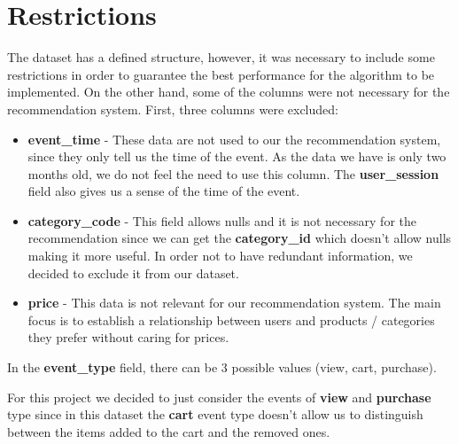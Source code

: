 \section{Restrictions}
\label{restrictions}

The dataset has a defined structure, however, it was necessary to include some restrictions in order to guarantee the best performance for the algorithm to be implemented.
On the other hand, some of the columns were not necessary for the recommendation system.
First, three columns were excluded:
\begin{itemize}
    \item \textbf{event\_time} - These data are not used to our the recommendation system, since they only tell us the time of the event.
    As the data we have is only two months old, we do not feel the need to use this column.
    The \textbf{user\_session} field also gives us a sense of the time of the event.
    \item \textbf{category\_code} - This field allows nulls and it is not necessary for the recommendation since we can get the \textbf{category\_id} which doesn't 
    allow nulls making it more useful.
    In order not to have redundant information, we decided to exclude it from our dataset.
    \item \textbf{price} - This data is not relevant for our recommendation system.
    The main focus is to establish a relationship between users and products / categories they prefer without caring for prices.
\end{itemize}

In the \textbf{event\_type} field, there can be 3 possible values (view, cart, purchase).

For this project we decided to just consider the events of \textbf{view} and \textbf{purchase} type since in this dataset the \textbf{cart} event type
doesn't allow us to distinguish between the items added to the cart and the removed ones.


